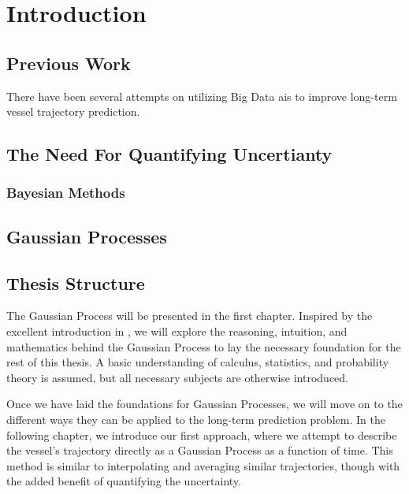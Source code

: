\chapter{Introduction}
\section{Previous Work}
There have been several attempts on utilizing Big Data \acrshort{ais} to improve long-term vessel trajectory prediction. 



\section{The Need For Quantifying Uncertianty}

\subsection{Bayesian Methods}
\section{Gaussian Processes}

\section{Thesis Structure}
The Gaussian Process will be presented in the first chapter. Inspired by the excellent introduction in \cite{rasmussen}, we will explore the reasoning, intuition, and mathematics behind the Gaussian Process to lay the necessary foundation for the rest of this thesis. A basic understanding of calculus, statistics, and probability theory is assumed, but all necessary subjects are otherwise introduced.  

Once we have laid the foundations for Gaussian Processes, we will move on to the different ways they can be applied to the long-term prediction problem. In the following chapter, we introduce our first approach, where we attempt to describe the vessel's trajectory directly as a Gaussian Process as a function of time. This method is similar to interpolating and averaging similar trajectories, though with the added benefit of quantifying the uncertainty.

